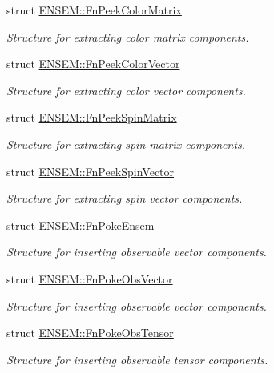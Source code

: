 \begin{DoxyCompactItemize}
struct \mbox{\hyperlink{structENSEM_1_1FnPeekColorMatrix}{E\+N\+S\+E\+M\+::\+Fn\+Peek\+Color\+Matrix}}
\begin{DoxyCompactList}\small\item\em Structure for extracting color matrix components. \end{DoxyCompactList}\item 
struct \mbox{\hyperlink{structENSEM_1_1FnPeekColorVector}{E\+N\+S\+E\+M\+::\+Fn\+Peek\+Color\+Vector}}
\begin{DoxyCompactList}\small\item\em Structure for extracting color vector components. \end{DoxyCompactList}\item 
struct \mbox{\hyperlink{structENSEM_1_1FnPeekSpinMatrix}{E\+N\+S\+E\+M\+::\+Fn\+Peek\+Spin\+Matrix}}
\begin{DoxyCompactList}\small\item\em Structure for extracting spin matrix components. \end{DoxyCompactList}\item 
struct \mbox{\hyperlink{structENSEM_1_1FnPeekSpinVector}{E\+N\+S\+E\+M\+::\+Fn\+Peek\+Spin\+Vector}}
\begin{DoxyCompactList}\small\item\em Structure for extracting spin vector components. \end{DoxyCompactList}\item 
struct \mbox{\hyperlink{structENSEM_1_1FnPokeEnsem}{E\+N\+S\+E\+M\+::\+Fn\+Poke\+Ensem}}
\begin{DoxyCompactList}\small\item\em Structure for inserting observable vector components. \end{DoxyCompactList}\item 
struct \mbox{\hyperlink{structENSEM_1_1FnPokeObsVector}{E\+N\+S\+E\+M\+::\+Fn\+Poke\+Obs\+Vector}}
\begin{DoxyCompactList}\small\item\em Structure for inserting observable vector components. \end{DoxyCompactList}\item 
struct \mbox{\hyperlink{structENSEM_1_1FnPokeObsTensor}{E\+N\+S\+E\+M\+::\+Fn\+Poke\+Obs\+Tensor}}
\begin{DoxyCompactList}\small\item\em Structure for inserting observable tensor components. \end{DoxyCompactList}\item 

\end{DoxyCompactItemize}
